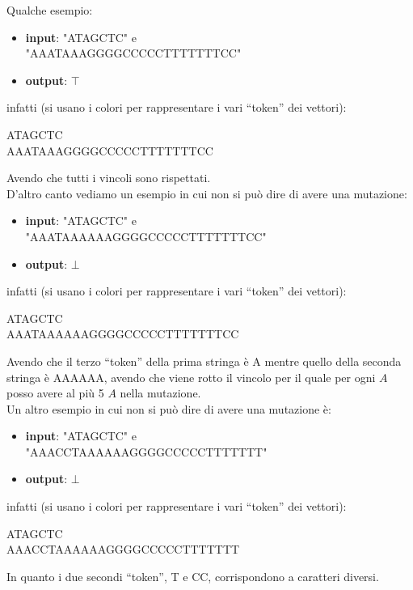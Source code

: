 \documentclass[a4paper,12pt, oneside]{book}
\begin{document}
\begin{esempio}
  Qualche esempio:
  \begin{itemize}
    \item \textbf{input}: "ATAGCTC" e \\"AAATAAAGGGGCCCCCTTTTTTTCC" 
    \item \textbf{output}: $\top$
  \end{itemize}
  infatti (si usano i colori per rappresentare i vari ``token'' dei vettori):
  \begin{center}
    \color{blue}A\color{green}T\color{blue}A\color{red}G\color{yellow}C\color{green}T\color{yellow}C\\ 
    \color{blue}AAA\color{green}T\color{blue}AAA\color{red}GGGG\color{yellow}CCCCC\color{green}TTTTTTT\color{yellow}CC
  \end{center}
  Avendo che tutti i vincoli sono rispettati.
  \\
  D'altro canto vediamo un esempio in cui non si può dire di avere una
  mutazione: 
  \begin{itemize}
    \item \textbf{input}: "ATAGCTC" e \\"AAATAAAAAAGGGGCCCCCTTTTTTTCC" 
    \item \textbf{output}: $\bot$
  \end{itemize}
  infatti (si usano i colori per rappresentare i vari ``token'' dei vettori):
  \begin{center}
    \color{blue}A\color{green}T\color{blue}A\color{red}G\color{yellow}C\color{green}T\color{yellow}C\\ 
    \color{blue}AAA\color{green}T\color{blue}AAAAAA\color{red}GGGG\color{yellow}CCCCC\color{green}TTTTTTT\color{yellow}CC
  \end{center}
  Avendo che il terzo ``token'' della prima stringa è {\color{blue}A} mentre
  quello della seconda stringa è {\color{blue}AAAAAA}, avendo che viene rotto il
  vincolo per il quale per ogni $A$ posso avere al più 5 $A$ nella mutazione.\\
  Un altro esempio in cui non si può dire di avere una
  mutazione è: 
  \begin{itemize}
    \item \textbf{input}: "ATAGCTC" e \\"AAACCTAAAAAAGGGGCCCCCTTTTTTT" 
    \item \textbf{output}: $\bot$
  \end{itemize}
   infatti (si usano i colori per rappresentare i vari ``token'' dei vettori):
  \begin{center}
    \color{blue}A\color{green}T\color{blue}A\color{red}G\color{yellow}C\color{green}T\color{yellow}C\\ 
    \color{blue}AAA\color{yellow}CC\color{green}T\color{blue}AAAAAA\color{red}GGGG\color{yellow}CCCCC\color{green}TTTTTTT
  \end{center}
  In quanto i due secondi ``token'', {\color{green}T} e {\color{yellow}CC},
  corrispondono a caratteri diversi.
\end{esempio}
\newpage
\end{document}
